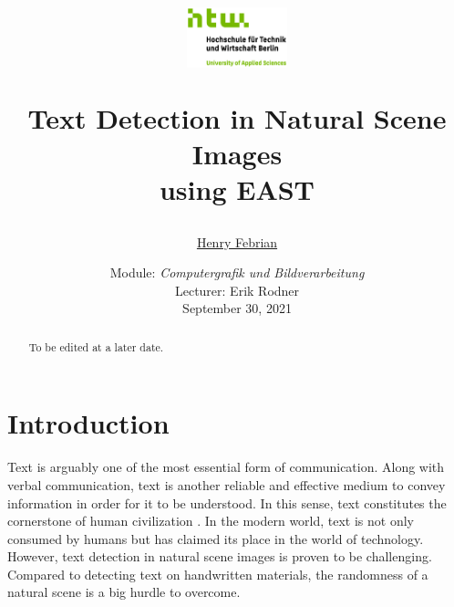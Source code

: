 \documentclass[10pt, a4paper]{article}
\begin{document}
	\title{
	\begin{figure}[!ht]
			\includegraphics[width=0.26\textwidth]{img/htwlogo.jpg}
	\end{figure}
	\vspace{1cm}
	\Huge Text Detection in Natural Scene Images \\
	using EAST
	}
	
	\vspace{1cm}
	
	
	\author{\Large \href{mailto:s0566146@htw-berlin.de}{Henry Febrian}
	\vspace{1cm}}
	
	\date{
	\large Module: \textit{Computergrafik und Bildverarbeitung} \\
	\vspace{0.8cm}
	\large Lecturer: Erik Rodner \\
	\vspace{1cm}
	\large September 30, 2021
	}

	\maketitle
	\setlength{\parindent}{0pt}

\vspace{2cm}
\begin{abstract}
To be edited at a later date. 

\end{abstract}
	\newpage
	\tableofcontents
	\newpage
	
\section{Introduction} %
\label{sec:introduction}
Text is arguably one of the most essential form of communication. Along with verbal communication, text is another reliable and effective medium to convey information in order for it to be understood. In this sense, text constitutes the cornerstone of human civilization \citep{LongEtAl}.
In the modern world, text is not only consumed by humans but has claimed its place in the world of technology.
However, text detection in natural scene images is proven to be challenging. Compared to detecting text on handwritten materials, the randomness of a natural scene is a big hurdle to overcome.
\end{document}
